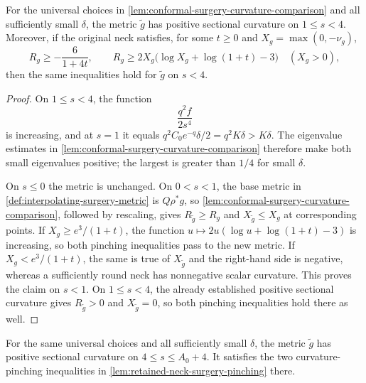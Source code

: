 \begin{lemma}
\label{lem:retained-neck-surgery-pinching}
\notready
For the universal choices in
\ref{lem:conformal-surgery-curvature-comparison} and all sufficiently
small $\delta$, the metric $\widetilde g$ has positive sectional curvature
on $1\le s<4$.  Moreover, if the original neck satisfies, for some
$t\ge0$ and $X_g=\max(0,-\nu_g)$,
\[
 R_g\ge-\frac6{1+4t},
 \qquad
 R_g\ge2X_g\bigl(\log X_g+\log(1+t)-3\bigr)
 \quad(X_g>0),
\]
then the same inequalities hold for $\widetilde g$ on $s<4$.
\end{lemma}

\begin{proof}
On $1\le s<4$, the function
\[
 \frac{q^2f}{2s^4}
\]
is increasing, and at $s=1$ it equals
$q^2C_0e^{-q}\delta/2=q^2K\delta>K\delta$.  The eigenvalue estimates in
\ref{lem:conformal-surgery-curvature-comparison} therefore make both
small eigenvalues positive; the largest is greater than $1/4$ for small
$\delta$.

On $s\le0$ the metric is unchanged.  On $0<s<1$, the base metric in
\ref{def:interpolating-surgery-metric} is $Q\rho^*g$, so
\ref{lem:conformal-surgery-curvature-comparison}, followed by rescaling,
gives $R_{\widetilde g}\ge R_g$ and
$X_{\widetilde g}\le X_g$ at corresponding points.  If
$X_g\ge e^3/(1+t)$, the function
$u\mapsto2u(\log u+\log(1+t)-3)$ is increasing, so both pinching
inequalities pass to the new metric.  If $X_g<e^3/(1+t)$, the same is true
of $X_{\widetilde g}$ and the right-hand side is negative, whereas a
sufficiently round neck has nonnegative scalar curvature.  This proves the
claim on $s<1$.  On $1\le s<4$, the already established positive
sectional curvature gives $R_{\widetilde g}>0$ and
$X_{\widetilde g}=0$, so both pinching inequalities hold there as well.
\end{proof}

\begin{lemma}
\label{lem:standard-cap-surgery-curvature}
\notready
For the same universal choices and all sufficiently small $\delta$, the
metric $\widetilde g$ has positive sectional curvature on
$4\le s\le A_0+4$.  It satisfies the two curvature-pinching inequalities
in \ref{lem:retained-neck-surgery-pinching} there.
\end{lemma}

